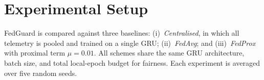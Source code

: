 \section{Experimental Setup}
FedGuard is compared against three baselines: (i)~\textit{Centralised}, in which all
telemetry is pooled and trained on a single GRU; (ii)~\textit{FedAvg}; and
(iii)~\textit{FedProx} with proximal term $\mu = 0.01$. All schemes share the same GRU
architecture, batch size, and total local-epoch budget for fairness. Each experiment is
averaged over five random seeds.
